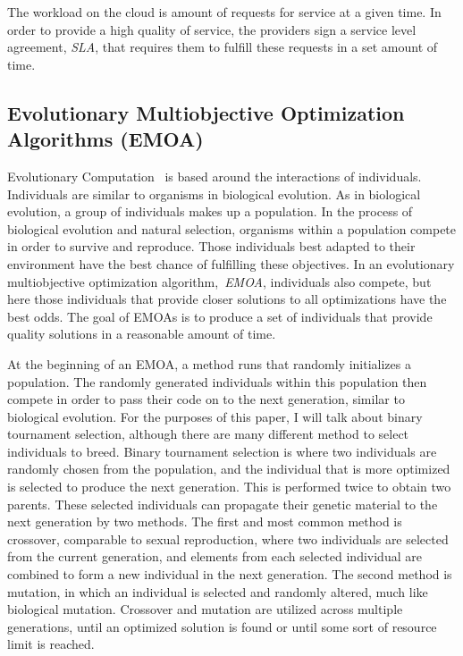 \documentclass{sig-alternate}
\begin{document}
The workload on the cloud is amount of requests for service at a given time. In order to provide a high quality of service, the providers sign a service level agreement, \emph{SLA}, that requires them to fulfill these requests in a set amount of time. 

\subsection{Evolutionary Multiobjective Optimization Algorithms (EMOA)}
\label{sec:EMOA}

Evolutionary Computation~\cite{poli08:fieldguide} is based around the interactions of individuals. Individuals are similar to organisms in biological evolution. As in biological evolution, a group of individuals makes up a population. In the process of biological evolution and natural selection, organisms within a population compete in order to survive and reproduce. Those individuals best adapted to their environment have the best chance of fulfilling these objectives.  In an evolutionary multiobjective optimization algorithm,~\emph{EMOA}, individuals also compete, but here those individuals that provide closer solutions to all optimizations have the best odds. The goal of EMOAs is to produce a set of individuals that provide quality solutions in a reasonable amount of time. 

At the beginning of an EMOA, a method runs that randomly initializes a population. The randomly generated individuals within this population then compete in order to pass their code on to the next generation, similar to biological evolution. For the purposes of this paper, I will talk about binary tournament selection, although there are many different method to select individuals to breed. Binary tournament selection is where two individuals are randomly chosen from the population, and the individual that is more optimized is selected to produce the next generation. This is performed twice to obtain two parents.  These selected individuals can propagate their genetic material to the next generation by two methods. The first and most common method is crossover, comparable to sexual reproduction, where two individuals are selected from the current generation, and elements from each selected individual are combined to form a new individual in the next generation. The second method is mutation, in which an individual is selected and randomly altered, much like biological mutation. Crossover and mutation are utilized across multiple generations, until an optimized solution is found or until some sort of resource limit is reached.
\end{document}
